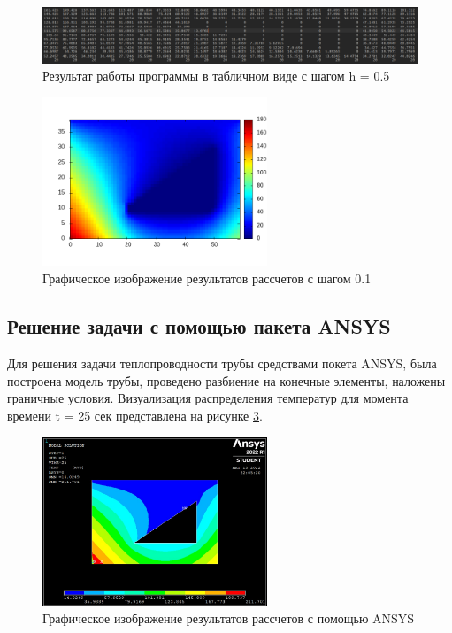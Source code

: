 \documentclass[12pt, a4paper]{article}
\begin{document}
	\begin{figure}[h]
		\centering    %
		\includegraphics[width=1\textwidth]{static/TableResult.png}
		\caption{Результат работы программы в табличном виде с шагом h = 0.5} %
		\label{fig:pic3} %
	\end{figure}
	
	\begin{figure}[h]
		\centering    %
		\includegraphics[width=0.6\textwidth]{static/heatmap.png}
		\caption{Графическое изображение результатов рассчетов с шагом 0.1} %
		\label{fig:pic2} %
	\end{figure}

    \subsection{Решение задачи с помощью пакета ANSYS}
    Для решения задачи теплопроводности трубы средствами покета ANSYS, была построена модель трубы, проведено разбиение на конечные элементы, наложены граничные условия. Визуализация распределения температур для момента времени t = 25 сек представлена на рисунке \ref{fig:pic4}.
    
    \begin{figure}[h]
    	\centering    %
    	\includegraphics[width=0.6\textwidth]{static/AnsysResult.jpg}
    	\caption{Графическое изображение результатов рассчетов с помощью ANSYS} %
    	\label{fig:pic4} %
    \end{figure}
\end{document}
